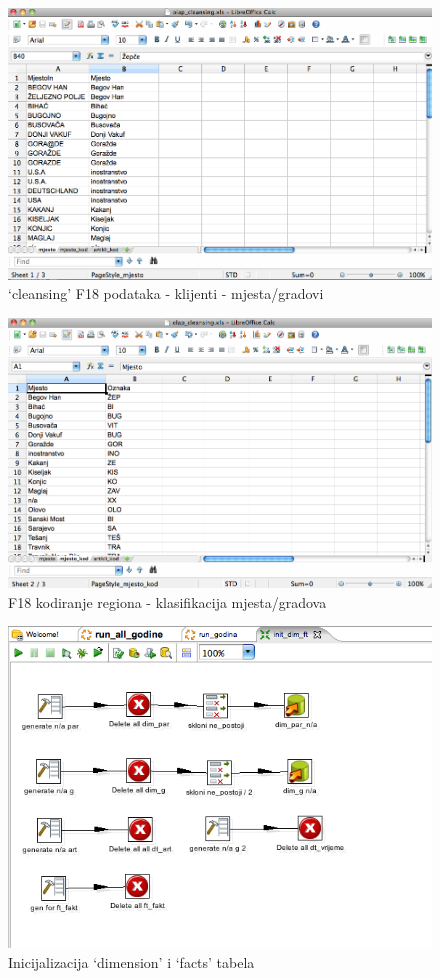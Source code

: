 \documentclass[times, utf8, seminar]{fit}
\begin{document}
\begin{figure}[H]
\centering
\includegraphics[width=15cm]{img/clean_mjesto.png}
\caption{`cleansing' F18 podataka -  klijenti - mjesta/gradovi}
\end{figure}


\begin{figure}[H]
\centering
\includegraphics[width=15cm]{img/clean_mjesto_region.png}
\caption{F18 kodiranje regiona - klasifikacija mjesta/gradova}
\end{figure}


\begin{figure}[H]
\centering
\includegraphics[width=15cm]{img/kettle_tr_init_dim_fpt.png}
\caption{Inicijalizacija `dimension' i `facts' tabela}
\end{figure}
\end{document}
